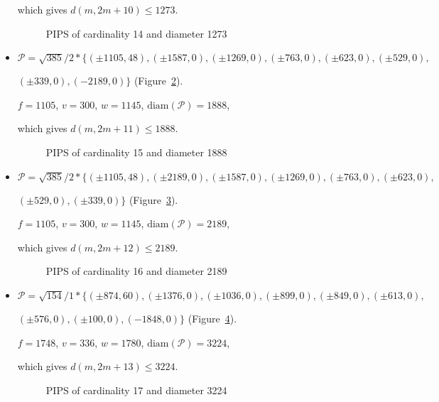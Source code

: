\documentclass[12pt]{article}
\theoremstyle{theorem}
\theoremstyle{dfn}
\theoremstyle{remark}
\begin{document}
\begin{itemize}
which gives $d(m, 2m + 10) \leq 1273$.


\begin{figure}[h!]
\parbox{0.7\linewidth}{\caption{PIPS of cardinality 14 and diameter 1273}
\label{picture_7.png}}
\end{figure}


\item
$\mathcal{P}=\sqrt{385}/{2} * \{ (\pm 1105, 48),
(\pm 1587 , 0),
(\pm 1269 , 0),
(\pm 763 , 0),
(\pm 623 , 0),
(\pm 529 , 0),
$

$
(\pm 339 , 0),
(-2189 , 0)\}
$
(Figure~\ref{picture_8.png}).

$f = 1105$, $v = 300$, $w = 1145$, $\operatorname{diam(\mathcal{P})} = 1888$,

which gives $d(m, 2m + 11) \leq 1888$.


\begin{figure}[h!]
\parbox{0.75\linewidth}{\caption{PIPS of cardinality 15 and diameter 1888}
\label{picture_8.png}}
\end{figure}


\item
$\mathcal{P}=\sqrt{385}/{2} * \{ (\pm 1105, 48),
(\pm 2189 , 0),
(\pm 1587 , 0),
(\pm 1269 , 0),
(\pm 763 , 0),
(\pm 623 , 0),
$

$
(\pm 529 , 0),
(\pm 339 , 0)\}
$
(Figure~\ref{picture_9.png}).

$f = 1105$, $v = 300$, $w = 1145$, $\operatorname{diam(\mathcal{P})} = 2189$,

which gives $d(m, 2m + 12) \leq 2189$.


\begin{figure}[h!]
\parbox{0.75\linewidth}{\caption{PIPS of cardinality 16 and diameter 2189}
\label{picture_9.png}}
\end{figure}


\item
$\mathcal{P}=\sqrt{154}/{1} * \{ (\pm 874, 60),
(\pm 1376 , 0),
(\pm 1036 , 0),
(\pm 899 , 0),
(\pm 849 , 0),
(\pm 613 , 0),
$

$
(\pm 576 , 0),
(\pm 100 , 0),
(-1848 , 0)\}
$
(Figure~\ref{picture_13.png}).

$f = 1748$, $v = 336$, $w = 1780$, $\operatorname{diam(\mathcal{P})} = 3224$,

which gives $d(m, 2m + 13) \leq 3224$.


\begin{figure}[h!]
\parbox{0.85\linewidth}{\caption{PIPS of cardinality 17 and diameter 3224}
\label{picture_13.png}}
\end{figure}



\end{itemize}
\end{document}
